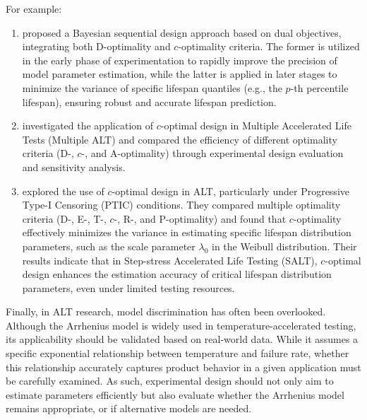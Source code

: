 For example:
\begin{enumerate}

\item \cite{lu2019bayesian} proposed a Bayesian sequential design approach based on dual objectives, integrating both D-optimality and $c$-optimality criteria. The former is utilized in the early phase of experimentation to rapidly improve the precision of model parameter estimation, while the latter is applied in later stages to minimize the variance of specific lifespan quantiles (e.g., the $p$-th percentile lifespan), ensuring robust and accurate lifespan prediction.

\item \cite{abd2020optimal} investigated the application of $c$-optimal design in Multiple Accelerated Life Tests (Multiple ALT) and compared the efficiency of different optimality criteria (D-, $c$-, and A-optimality) through experimental design evaluation and sensitivity analysis.

\item \cite{newer2024optimal} explored the use of $c$-optimal design in ALT, particularly under Progressive Type-I Censoring (PTIC) conditions. They compared multiple optimality criteria (D-, E-, T-, $c$-, R-, and P-optimality) and found that $c$-optimality effectively minimizes the variance in estimating specific lifespan distribution parameters, such as the scale parameter $\lambda_0$ in the Weibull distribution. Their results indicate that in Step-stress Accelerated Life Testing (SALT), $c$-optimal design enhances the estimation accuracy of critical lifespan distribution parameters, even under limited testing resources.

\end{enumerate}

\hspace*{8mm} Finally, in ALT research, model discrimination has often been overlooked. Although the Arrhenius model is widely used in temperature-accelerated testing, its applicability should be validated based on real-world data. While it assumes a specific exponential relationship between temperature and failure rate, whether this relationship accurately captures product behavior in a given application must be carefully examined. As such, experimental design should not only aim to estimate parameters efficiently but also evaluate whether the Arrhenius model remains appropriate, or if alternative models are needed.

